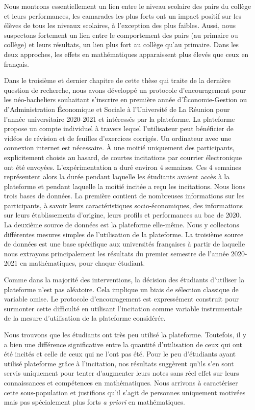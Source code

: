 \documentclass[
]{book}
\begin{document}
Nous montrons essentiellement un lien entre le niveau scolaire des pairs du collège et leurs performances, les camarades les plus forts ont un impact positif sur les élèves de tous les niveaux scolaires, à l'exception des plus faibles. Aussi, nous suspectons fortement un lien entre le comportement des pairs (au primaire ou collège) et leurs résultats, un lien plus fort au collège qu'au primaire. Dans les deux approches, les effets en mathématiques apparaissent plus élevés que ceux en français.

\quad Dans le troisième et dernier chapitre de cette thèse qui traite de la dernière question de recherche, nous avons développé un protocole d'encouragement pour les néo-bacheliers souhaitant s'inscrire en première année d'Économie-Gestion ou d'Administration Économique et Sociale à l'Université de La Réunion pour l'année universitaire 2020-2021 et intéressés par la plateforme. La plateforme propose un compte individuel à travers lequel l'utilisateur peut bénéficier de vidéos de révision et de feuilles d'exercices corrigés. Un ordinateur avec une connexion internet est nécessaire. À une moitié uniquement des participants, explicitement choisis au hasard, de courtes incitations par courrier électronique ont été envoyées. L'expérimentation a duré environ 4 semaines. Ces 4 semaines représentent alors la durée pendant laquelle les étudiants avaient accès à la plateforme et pendant laquelle la moitié incitée a reçu les incitations. Nous lions trois bases de données. La première contient de nombreuses informations sur les participants, à savoir leurs caractéristiques socio-économiques, des informations sur leurs établissements d'origine, leurs profils et performances au bac de 2020. La deuxième source de données est la plateforme elle-même. Nous y collectons différentes mesures simples de l'utilisation de la plateforme. La troisième source de données est une base spécifique aux universités françaises à partir de laquelle nous extrayons principalement les résultats du premier semestre de l'année 2020-2021 en mathématiques, pour chaque étudiant.

Comme dans la majorité des interventions, la décision des étudiants d'utiliser la plateforme n'est pas aléatoire. Cela implique un biais de sélection classique de variable omise. Le protocole d'encouragement est expressément construit pour surmonter cette difficulté en utilisant l'incitation comme variable instrumentale de la mesure d'utilisation de la plateforme considérée.

Nous trouvons que les étudiants ont très peu utilisé la plateforme. Toutefois, il y a bien une différence significative entre la quantité d'utilisation de ceux qui ont été incités et celle de ceux qui ne l'ont pas été. Pour le peu d'étudiants ayant utilisé plateforme grâce à l'incitation, nos résultats suggèrent qu'ils s'en sont servis uniquement pour tenter d'augmenter leurs notes sans réel effet sur leurs connaissances et compétences en mathématiques. Nous arrivons à caractériser cette sous-population et justifions qu'il s'agit de personnes uniquement motivées mais pas spécialement plus forts \emph{a priori} en mathématiques.
\end{document}
